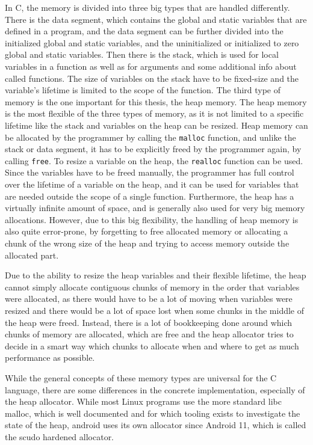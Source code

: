 \documentclass[a4paper,11pt,oneside]{report}
\begin{document}
In C, the memory is divided into three big types that are handled differently.
There is the data segment, which contains the global and static variables that
are defined in a program, and the data segment can be further divided into the
initialized global and static variables, and the uninitialized or initialized to
zero global and static variables.
Then there is the stack, which is used for local variables in a function as well
as for arguments and some additional info about called functions. The size of
variables on the stack have to be fixed-size and the variable's lifetime is
limited to the scope of the function.
The third type of memory is the one important for this thesis, the heap memory.
The heap memory is the most flexible of the three types of memory, as it is not
limited to a specific lifetime like the stack and variables on the heap can be
resized. Heap memory can be allocated by the programmer by calling the \verb|malloc|
function, and unlike the stack or data segment, it has to be explicitly freed by
the programmer again, by calling \verb|free|. To resize a variable on the heap, the
\verb|realloc| function can be used. Since the variables have to be freed manually,
the programmer has full control over the lifetime of a variable on the heap, and
it can be used for variables that are needed outside the scope of a single
function. Furthermore, the heap has a virtually infinite amount of space, and is
generally also used for very big memory allocations. However, due to this big
flexibility, the handling of heap memory is also quite error-prone, by forgetting
to free allocated memory or allocating a chunk of the wrong size of the heap and
trying to access memory outside the allocated part.

Due to the ability to resize the heap variables and their flexible lifetime, the
heap cannot simply allocate contiguous chunks of memory in the order that variables
were allocated, as there would have to be a lot of moving when variables were
resized and there would be a lot of space lost when some chunks in the middle of
the heap were freed. Instead, there is a lot of bookkeeping done around which
chunks of memory are allocated, which are free and the heap allocator tries to
decide in a smart way which chunks to allocate when and where to get as much
performance as possible.

While the general concepts of these memory types are universal for the C language,
there are some differences in the concrete implementation, especially of the heap
allocator. While most Linux programs use the more standard libc malloc, which is
well documented and for which tooling exists to investigate the state of the heap,
android uses its own allocator since Android 11, which is called the scudo
hardened allocator.
\end{document}
